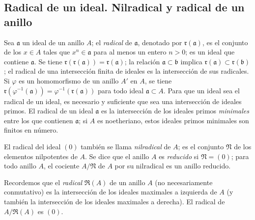 \subsection{Radical de un ideal. Nilradical y radical de un anillo}
\label{subsection:0.1.1-fr}

\begin{env}[1.1.1]
\label{0.1.1.1-fr}
Sea $\mathfrak{a}$ un ideal de un anillo $A$; el \emph{radical} de $\mathfrak{a}$, denotado por $\mathfrak{r}(\mathfrak{a})$, es el conjunto de los $x\in A$ tales que $x^n\in\mathfrak{a}$ para al menos un entero $n>0$; es un ideal que contiene $\mathfrak{a}$.
Se tiene $\mathfrak{r}(\mathfrak{r}(\mathfrak{a}))=\mathfrak{r}(\mathfrak{a})$; la relación $\mathfrak{a}\subset\mathfrak{b}$ implica $\mathfrak{r}(\mathfrak{a})\subset\mathfrak{r}(\mathfrak{b})$; el radical de una intersección finita de ideales es la intersección de sus radicales.
Si $\varphi$ es un homomorfismo de un anillo $A'$ en $A$, se tiene $\mathfrak{r}(\varphi^{-1}(\mathfrak{a}))=\varphi^{-1}(\mathfrak{r}(\mathfrak{a}))$ para todo ideal $\mathfrak{a}\subset A$.
Para que un ideal sea el radical de un ideal, es necesario y suficiente que sea una intersección de ideales primos.
El radical de un ideal $\mathfrak{a}$ es la intersección de los ideales primos \emph{minimales} entre los que contienen $\mathfrak{a}$; si $A$ es noetheriano, estos ideales primos minimales son finitos en número.

El radical del ideal $(0)$ también se llama \emph{nilradical} de $A$; es el conjunto $\mathfrak{N}$ de los elementos nilpotentes de $A$.
Se dice que el anillo $A$ es \emph{reducido} si $\mathfrak{N}=(0)$; para todo anillo $A$, el cociente $A/\mathfrak{N}$ de $A$ por su nilradical es un anillo reducido.
\end{env}

\begin{env}[1.1.2]
\label{0.1.1.2-fr}
Recordemos que el \emph{radical} $\mathfrak{R}(A)$ de un anillo $A$ (no necesariamente conmutativo) es la intersección de los ideales maximales a izquierda de $A$ (y también la intersección de los ideales maximales a derecha).
El radical de $A/\mathfrak{R}(A)$ es $(0)$.
\end{env}
